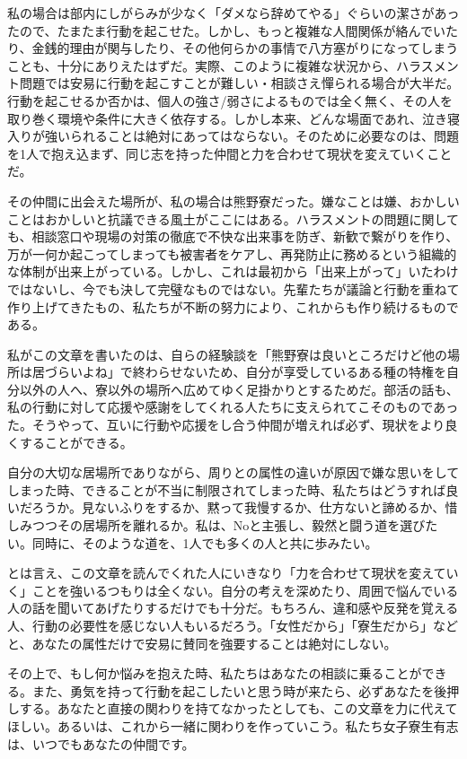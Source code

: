 \par 私の場合は部内にしがらみが少なく「ダメなら辞めてやる」ぐらいの潔さがあったので、たまたま行動を起こせた。しかし、もっと複雑な人間関係が絡んでいたり、金銭的理由が関与したり、その他何らかの事情で八方塞がりになってしまうことも、十分にありえたはずだ。実際、このように複雑な状況から、ハラスメント問題では安易に行動を起こすことが難しい・相談さえ憚られる場合が大半だ。行動を起こせるか否かは、個人の強さ/弱さによるものでは全く無く、その人を取り巻く環境や条件に大きく依存する。しかし本来、どんな場面であれ、泣き寝入りが強いられることは絶対にあってはならない。そのために必要なのは、問題を1人で抱え込まず、同じ志を持った仲間と力を合わせて現状を変えていくことだ。


\par その仲間に出会えた場所が、私の場合は熊野寮だった。嫌なことは嫌、おかしいことはおかしいと抗議できる風土がここにはある。ハラスメントの問題に関しても、相談窓口や現場の対策の徹底で不快な出来事を防ぎ、新歓で繋がりを作り、万が一何か起こってしまっても被害者をケアし、再発防止に務めるという組織的な体制が出来上がっている。しかし、これは最初から「出来上がって」いたわけではないし、今でも決して完璧なものではない。先輩たちが議論と行動を重ねて作り上げてきたもの、私たちが不断の努力により、これからも作り続けるものである。


\par 私がこの文章を書いたのは、自らの経験談を「熊野寮は良いところだけど他の場所は居づらいよね」で終わらせないため、自分が享受しているある種の特権を自分以外の人へ、寮以外の場所へ広めてゆく足掛かりとするためだ。部活の話も、私の行動に対して応援や感謝をしてくれる人たちに支えられてこそのものであった。そうやって、互いに行動や応援をし合う仲間が増えれば必ず、現状をより良くすることができる。


\par 自分の大切な居場所でありながら、周りとの属性の違いが原因で嫌な思いをしてしまった時、できることが不当に制限されてしまった時、私たちはどうすれば良いだろうか。見ないふりをするか、黙って我慢するか、仕方ないと諦めるか、惜しみつつその居場所を離れるか。私は、Noと主張し、毅然と闘う道を選びたい。同時に、そのような道を、1人でも多くの人と共に歩みたい。


\par とは言え、この文章を読んでくれた人にいきなり「力を合わせて現状を変えていく」ことを強いるつもりは全くない。自分の考えを深めたり、周囲で悩んでいる人の話を聞いてあげたりするだけでも十分だ。もちろん、違和感や反発を覚える人、行動の必要性を感じない人もいるだろう。「女性だから」「寮生だから」などと、あなたの属性だけで安易に賛同を強要することは絶対にしない。


\par その上で、もし何か悩みを抱えた時、私たちはあなたの相談に乗ることができる。また、勇気を持って行動を起こしたいと思う時が来たら、必ずあなたを後押しする。あなたと直接の関わりを持てなかったとしても、この文章を力に代えてほしい。あるいは、これから一緒に関わりを作っていこう。私たち女子寮生有志は、いつでもあなたの仲間です。